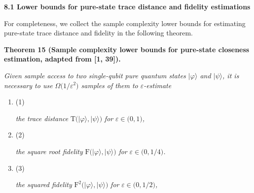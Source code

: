 \par\medskip\noindent\textbf{
8.1 Lower bounds for pure-state trace distance and fidelity estimations}\par




For completeness, we collect the sample complexity lower bounds for estimating pure-state trace distance and fidelity in the following theorem.\par





\par\medskip\noindent\textbf{
\textbf{Theorem 15}\textbf{ }(Sample complexity lower bounds for pure-state closeness estimation, adapted from [1, 39])\textbf{.}
}\par



\emph{Given sample access to two single-qubit pure quantum states $\lvert\varphi\rangle$ and $\lvert\psi\rangle$, it is necessary to use $\Omega\lparen 1/\varepsilon^{2}\rparen$ samples of them to $\varepsilon$-estimate}\par


\begin{enumerate}


\item[] 
(1) 


\emph{the trace distance }$\mathrm{T}\lparen\lvert\varphi\rangle,\lvert\psi\rangle\rparen$\emph{ for }$\varepsilon\in\lparen 0,1\rparen$\emph{,}\par





\item[] 
(2) 


\emph{the square root fidelity }$\mathrm{F}\lparen\lvert\varphi\rangle,\lvert\psi\rangle\rparen$\emph{ for }$\varepsilon\in\lparen 0,1/4\rparen$\emph{.}\par





\item[] 
(3) 


\emph{the squared fidelity }$\mathrm{F}^{2}\lparen\lvert\varphi\rangle,\lvert\psi\rangle\rparen$\emph{ for }$\varepsilon\in\lparen 0,1/2\rparen$\emph{,}\par





\end{enumerate}



